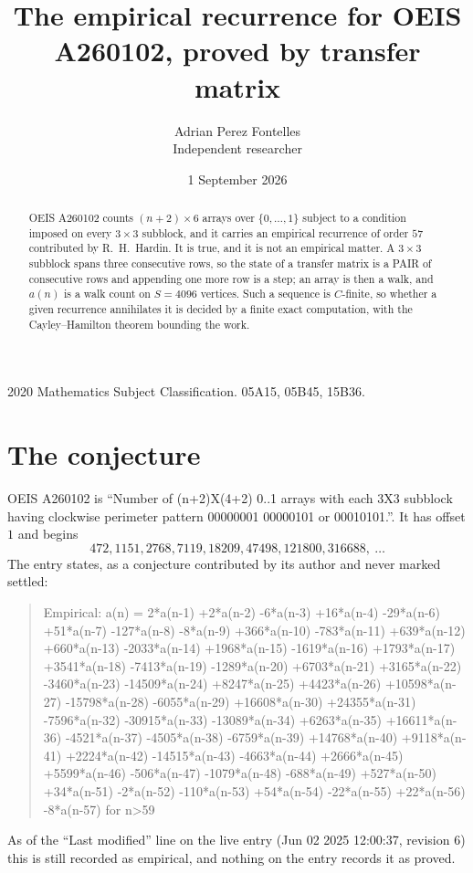 \documentclass[11pt,a4paper]{article}
\title{The empirical recurrence for OEIS A260102, proved by transfer matrix}
\author{Adrian Perez Fontelles\\ \small Independent researcher}
\date{1 September 2026}
\theoremstyle{plain}
\theoremstyle{definition}
\begin{document}
\maketitle

\begin{abstract}
OEIS A260102 counts $(n+2)\times6$ arrays over $\{0,\dots,1\}$ subject to a condition imposed on
every $3\times3$ subblock, and it carries an empirical recurrence of order $57$
contributed by R.~H.~Hardin. It is true, and it is not an empirical matter. A $3\times3$
subblock spans three consecutive rows, so the state of a transfer matrix is a PAIR of
consecutive rows and appending one more row is a step; an array is then a walk, and
$a(n)$ is a walk count on $S=4096$ vertices. Such a sequence is $C$-finite, so whether a given
recurrence annihilates it is decided by a finite exact computation, with the Cayley--Hamilton
theorem bounding the work.
\end{abstract}

\noindent\small 2020 Mathematics Subject Classification. 05A15, 05B45, 15B36.\normalsize

\section{The conjecture}

OEIS A260102 is ``Number of (n+2)X(4+2) 0..1 arrays with each 3X3 subblock having clockwise perimeter pattern 00000001 00000101 or 00010101.''. It has offset $1$ and begins
\[
472, 1151, 2768, 7119, 18209, 47498, 121800, 316688,\ \dots
\]
The entry states, as a conjecture contributed by its author and never marked settled:
\begin{quote}
Empirical: a(n) = 2*a(n-1) +2*a(n-2) -6*a(n-3) +16*a(n-4) -29*a(n-6) +51*a(n-7) -127*a(n-8) -8*a(n-9) +366*a(n-10) -783*a(n-11) +639*a(n-12) +660*a(n-13) -2033*a(n-14) +1968*a(n-15) -1619*a(n-16) +1793*a(n-17) +3541*a(n-18) -7413*a(n-19) -1289*a(n-20) +6703*a(n-21) +3165*a(n-22) -3460*a(n-23) -14509*a(n-24) +8247*a(n-25) +4423*a(n-26) +10598*a(n-27) -15798*a(n-28) -6055*a(n-29) +16608*a(n-30) +24355*a(n-31) -7596*a(n-32) -30915*a(n-33) -13089*a(n-34) +6263*a(n-35) +16611*a(n-36) -4521*a(n-37) -4505*a(n-38) -6759*a(n-39) +14768*a(n-40) +9118*a(n-41) +2224*a(n-42) -14515*a(n-43) -4663*a(n-44) +2666*a(n-45) +5599*a(n-46) -506*a(n-47) -1079*a(n-48) -688*a(n-49) +527*a(n-50) +34*a(n-51) -2*a(n-52) -110*a(n-53) +54*a(n-54) -22*a(n-55) +22*a(n-56) -8*a(n-57) for n>59
\end{quote}
As of the ``Last modified'' line on the live entry (Jun 02 2025 12:00:37, revision 6) this is still
recorded as empirical, and nothing on the entry records it as proved.
\end{document}
